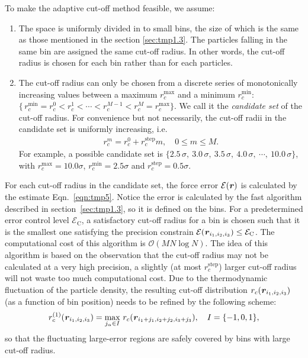 \documentclass[aps,pre,preprint]{revtex4-1}
\renewcommand{\v}[1]{\textbf{\textit{#1}}}
\begin{document}
To make the adaptive cut-off method feasible, we assume:
\begin{enumerate}
\item The space is uniformly divided in to small bins, the size of which is the
  same as those mentioned in the section \ref{sec:tmp1.3}.  The
  particles falling in the same bin are assigned the same cut-off
  radius. In other words, the cut-off radius is chosen for each bin
  rather than for each particles.
\item The cut-off radius can only be chosen from a discrete series of
  monotonically increasing values between a maximum 
  $r_c^{\textrm{max}}$ and a minimum 
  $r_c^{\textrm{min}}$: $\{\,r_c^{\textrm{min}} = r_c^0 < r_c^1 <
  \cdots < r_c^{M-1} <r_c^M = r_c^{\textrm{max}}\}$.  We call it the
  \emph{candidate set} of the cut-off radius.  For convenience but not
  necessarily, the cut-off radii in the candidate set is uniformly increasing, i.e.
  \begin{align}
    r_c^m = r_c^0 + r_c^{\textrm{step}} m, \quad 0 \leq m \leq M.
  \end{align}
  For example, a possible candidate set is $\{2.5\,\sigma,\
  3.0\,\sigma,\ 3.5\,\sigma,\ 4.0\,\sigma,\ \cdots,\ 10.0\,\sigma\}$,
  with $r_c^{\textrm{max}} = 10.0\sigma$, $r_c^{\textrm{min}} =
  2.5\sigma$ and $r_c^{\textrm{step}} = 0.5 \sigma$.
\end{enumerate}
For each cut-off radius in the candidate set, the force error
$\mathcal E(\v r)$ is calculated by the estimate Eqn.~\eqref{eqn:tmp5}.
Notice the error is calculated by the
fast algorithm described in section~\ref{sec:tmp1.3}, so it is
defined on the bins.  For a predetermined error control level
$\mathcal E_{\textrm{C}}$, a satisfactory cut-off radius for a bin is
chosen such that it is the smallest one satisfying the precision
constrain $\mathcal E(\v r_{i_1,i_2,i_3}) \leq \mathcal
E_{\textrm{C}}$. The computational cost of this algorithm is $\mathcal
O(MN\log N)$.  The idea of this algorithm is based on the observation
that the cut-off radius may not be calculated at a very high
precision, a slightly (at most $r_c^{\textrm{step}}$) larger
cut-off radius will not waste too much computational cost.  Due to the
thermodynamic fluctuation of the particle density, the resulting cut-off
distribution $r_c(\v r_{i_1,i_2,i_3})$ (as a function of bin
position) needs to be refined by the following scheme:
\begin{align}\label{eqn:rc-refine}
  r^{(1)}_c(\v r_{i_1,i_2,i_3}) = \max_{j_\alpha\in I}\,r_c(\v r_{i_1+j_1,i_2+j_2,i_3+j_3}),
  \quad I = \{-1, 0, 1\},
\end{align}
so that the fluctuating large-error regions are safely covered by bins
with large cut-off radius.
\end{document}
